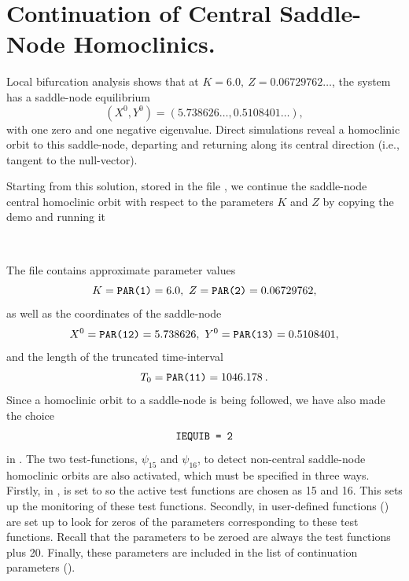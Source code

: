 \documentclass[12pt]{report}
\begin{document}
\section{Continuation of Central Saddle-Node Homoclinics.}
Local bifurcation analysis shows that at $K=6.0,\ Z=0.06729762\ldots$,
the system has a saddle-node equilibrium 
$$
(X^0,Y^0) = (5.738626\ldots,0.5108401\ldots),
$$
with one zero and one negative eigenvalue. Direct simulations reveal a
homoclinic 
orbit to this saddle-node, departing and returning along its central
direction (i.e., tangent to the null-vector).
\par
Starting from this solution, stored in the file , we
continue the saddle-node central homoclinic orbit 
with respect to the parameters $K$ and $Z$ by copying the
demo and running it
\begin{center}
\\
\end{center}
The file  contains approximate
parameter values
$$
K=\parf{PAR(1)}=6.0,\ Z=\parf{PAR(2)}=0.06729762,
$$
as well as the coordinates of the saddle-node
$$
X^0=\parf{PAR(12)}=5.738626,\ Y^0=\parf{PAR(13)}=0.5108401,
$$
and the length of the truncated time-interval
$$
T_0=\texttt{PAR(11)} = 1046.178 \: .
$$
Since a homoclinic orbit to a saddle-node is being followed, we have also
made the choice
$$
\texttt{IEQUIB = 2}
$$
in . The two test-functions, $\psi_{15}$ and $\psi_{16}$, 
to detect non-central saddle-node homoclinic
orbits are also activated, which must be specified in three ways. 
Firstly, in ,  is
set to \parf{[15,16]} so the active test functions
are chosen as 15 and 16. This sets up the monitoring of these
test functions. Secondly, in  user-defined functions
() are set up to look for zeros of the parameters
corresponding to these test functions. Recall that the
parameters to be zeroed are always the test functions plus 20.
Finally, these parameters are included in the list of continuation
parameters ().
\end{document}
